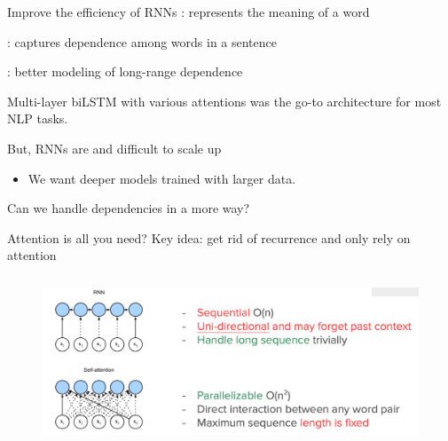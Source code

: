 \documentclass[usenames,dvipsnames,11pt,aspectratio=169]{beamer}
\begin{document}
\begin{frame}
    {Improve the efficiency of RNNs}
    : represents the meaning of a word 

    : captures dependence among words in a sentence 

    : better modeling of long-range dependence 

    Multi-layer biLSTM with various attentions was the go-to architecture for most NLP tasks.

    {But}, RNNs are  and difficult to scale up\\
    \begin{itemize}
        \item[] We want deeper models trained with larger data.
    \end{itemize}

    Can we handle dependencies in a more  way?
\end{frame}

\begin{frame}
    {Attention is all you need?}
    Key idea: get rid of recurrence and only rely on attention
    \begin{figure}
        \includegraphics[height=5cm]{figures/rnn-vs-attn}
    \end{figure}
\end{frame}
\end{document}

